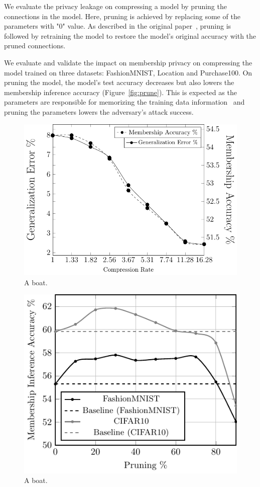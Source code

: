 We evaluate the privacy leakage on compressing a model by pruning the connections in the model.
Here, pruning is achieved by replacing some of the parameters with "0" value.
As described in the original paper~\cite{Han:2015:LBW:2969239.2969366,DBLP:journals/corr/HanPNMTECTD16}, pruning is followed by retraining the model to restore the model's original accuracy with the pruned connections.

We evaluate and validate the impact on membership privacy on compressing the model trained on three datasets: FashionMNIST, Location and Purchase100.
On pruning the model, the model's test accuracy decreases but also lowers the membership inference accuracy (Figure~\ref{fig:prune}).
This is expected as the parameters are responsible for memorizing the training data information~\cite{DBLP:journals/corr/abs-1812-00910,236216,10.1145/3133956.3134077} and pruning the parameters lowers the adversary's attack success.

\begin{figure}
  \includegraphics[width=0.7\columnwidth]{figures/fmnist_prune.pdf}
  \caption{A boat.}
  \label{fig:wtsharing}
\end{figure}

\begin{figure}
  \includegraphics[width=0.7\columnwidth]{figures/retrain.pdf}
  \caption{A boat.}
  \label{fig:wtsharing}
\end{figure}


